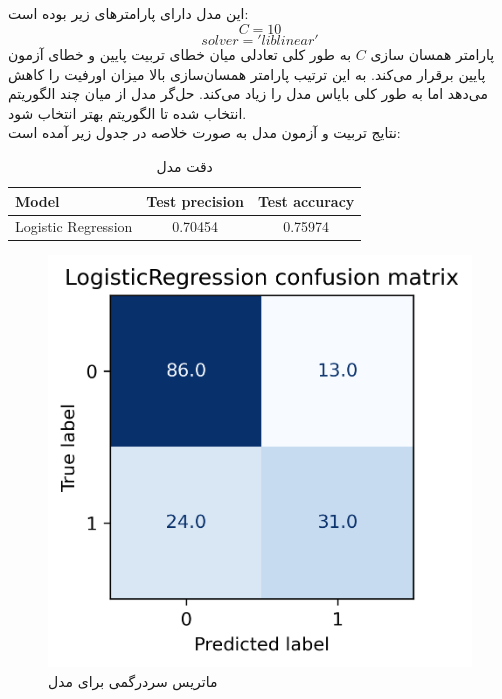 \documentclass[11pt]{article}
\begin{document}
	\subsection{}
		این مدل دارای پارامترهای زیر بوده است:
		$$C = 10$$
		$$solver = 'liblinear'$$
		پارامتر همسان سازی $C$ به طور کلی تعادلی میان خطای تربیت پایین و خطای آزمون پایین برقرار می‌کند. به این ترتیب پارامتر همسان‌سازی بالا میزان اورفیت را کاهش می‌دهد اما به طور کلی بایاس مدل را زیاد می‌کند. حل‌‌گر مدل از میا‌ن چند الگوریتم انتخاب شده تا الگوریتم بهتر انتخاب شود.\\
		نتایج تربیت و آزمون مدل به صورت خلاصه در جدول زیر آمده است:
		\begin{table}[h!]
			\caption{دقت مدل }
			\begin{latin}
				\centering
				\begin{tabular}{|l|c|c|}
					\hline
					\textbf{Model} & \textbf{Test precision} & \textbf{Test accuracy} \\ \hline
					Logistic Regression & 0.70454 & 0.75974 \\ \hline
				\end{tabular}
			\end{latin}
			\label{tab:logisticregression_results}
		\end{table}
		\begin{figure}[!h]
			\centerline{\includegraphics[width=0.5\linewidth]{../HW2_2/LogisticRegression confusion.png}}
			\caption{ماتریس سردرگمی برای مدل }
			\label{fig:confusion_logistic}
		\end{figure}
		\pagebreak
\end{document}
